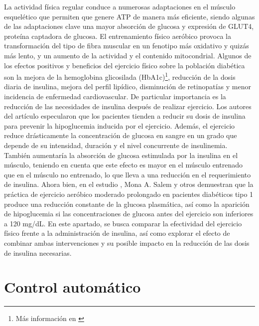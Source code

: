 La actividad física regular conduce a numerosas adaptaciones en el músculo esquelético que permiten que genere ATP de manera más eficiente, siendo algunas de las adaptaciones clave una mayor absorción de glucosa y expresión de GLUT4, proteína captadora de glucosa. El entrenamiento físico aeróbico provoca la transformación del tipo de fibra muscular en un fenotipo más oxidativo y quizás más lento, y un aumento de la actividad y el contenido mitocondrial. Algunos de los efectos positivos y beneficios del ejercicio físico sobre la población diabética son la mejora de la hemoglobina glicosilada (HbA1c)\footnote{Más información en \cite{diabetes2006effects}}, reducción de la dosis diaria de insulina, mejora del perfil lipídico, disminución de retinopatías y menor incidencia de enfermedad cardiovascular. De particular importancia es la reducción de las necesidades de insulina después de realizar ejercicio. Los autores del artículo especularon que los pacientes tienden a reducir su dosis de insulina para prevenir la hipoglucemia inducida por el ejercicio. Además, el ejercicio reduce drásticamente la concentración de glucosa en sangre en un grado que depende de su intensidad, duración y el nivel concurrente de insulinemia. También aumentaría la absorción de glucosa estimulada por la insulina en el músculo, teniendo en cuenta que este efecto es mayor en el músculo entrenado que en el músculo no entrenado, lo que lleva a una reducción en el requerimiento de insulina.
Ahora bien, en el estudio \cite{salem2010exercise}, Mona A. Salem y otros demuestran que la práctica de ejercicio aeróbico moderado prolongado en pacientes diabéticos tipo 1 produce una reducción constante de la glucosa plasmática, así como la aparición de hipoglucemia si las concentraciones de glucosa antes del ejercicio son inferiores a 120 mg/dL.
En este apartado, se busca comparar la efectividad del ejercicio físico frente a la administración de insulina, así como explorar el efecto de combinar ambas intervenciones y su posible impacto en la reducción de las dosis de insulina necesarias.

\section{Control automático}

